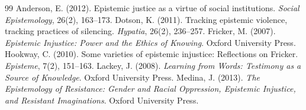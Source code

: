 \documentclass{situationist-preprint}
\begin{document}
\begin{thebibliography}{99}\small
{} Anderson, E. (2012). Epistemic justice as a virtue of social institutions. \emph{Social Epistemology}, 26(2), 163--173.
 Dotson, K. (2011). Tracking epistemic violence, tracking practices of silencing. \emph{Hypatia}, 26(2), 236--257.
 Fricker, M. (2007). \emph{Epistemic Injustice: Power and the Ethics of Knowing}. Oxford University Press.
 Hookway, C. (2010). Some varieties of epistemic injustice: Reflections on Fricker. \emph{Episteme}, 7(2), 151--163.
 Lackey, J. (2008). \emph{Learning from Words: Testimony as a Source of Knowledge}. Oxford University Press.
 Medina, J. (2013). \emph{The Epistemology of Resistance: Gender and Racial Oppression, Epistemic Injustice, and Resistant Imaginations}. Oxford University Press.
\end{thebibliography}
\end{document}
